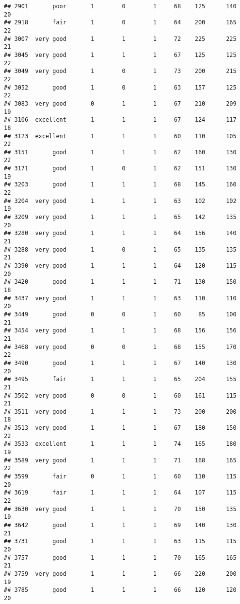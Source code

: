 \documentclass[]{article}
\begin{document}
\begin{verbatim}
## 2901       poor       1        0        1     68    125      140  20
## 2918       fair       1        0        1     64    200      165  22
## 3007  very good       1        1        1     72    225      225  21
## 3045  very good       1        1        1     67    125      125  22
## 3049  very good       1        0        1     73    200      215  22
## 3052       good       1        0        1     63    157      125  22
## 3083  very good       0        1        1     67    210      209  19
## 3106  excellent       1        1        1     67    124      117  18
## 3123  excellent       1        1        1     60    110      105  22
## 3151       good       1        1        1     62    160      130  22
## 3171       good       1        0        1     62    151      130  19
## 3203       good       1        1        1     68    145      160  22
## 3204  very good       1        1        1     63    102      102  19
## 3209  very good       1        1        1     65    142      135  20
## 3280  very good       1        1        1     64    156      140  21
## 3288  very good       1        0        1     65    135      135  21
## 3390  very good       1        1        1     64    120      115  20
## 3420       good       1        1        1     71    130      150  18
## 3437  very good       1        1        1     63    110      110  20
## 3449       good       0        0        1     60     85      100  21
## 3454  very good       1        1        1     68    156      156  21
## 3468  very good       0        0        1     68    155      170  22
## 3490       good       1        1        1     67    140      130  20
## 3495       fair       1        1        1     65    204      155  21
## 3502  very good       0        0        1     60    161      115  21
## 3511  very good       1        1        1     73    200      200  18
## 3513  very good       1        1        1     67    180      150  22
## 3533  excellent       1        1        1     74    165      180  19
## 3589  very good       1        1        1     71    168      165  22
## 3599       fair       0        1        1     60    110      115  20
## 3619       fair       1        1        1     64    107      115  22
## 3630  very good       1        1        1     70    150      135  19
## 3642       good       1        1        1     69    140      130  21
## 3731       good       1        1        1     63    115      115  20
## 3757       good       1        1        1     70    165      165  21
## 3759  very good       1        1        1     66    220      200  19
## 3785       good       1        1        1     66    120      120  20

\end{verbatim}
\end{document}
